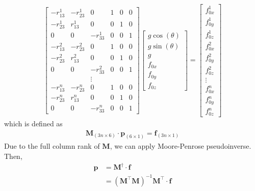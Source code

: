 \begin{equation}
\begin{split}
\begin{bmatrix}
-r_{13}^1		&-r_{23} ^1		&0			&1		&0		&0\\
-r_{23}^1		&r_{13}^1		&0			&0		&1		&0\\
0				&0				&-r_{33}^1	&0		&0		&1\\
-r_{13}^2		&-r_{23}^2 		&0			&1		&0		&0\\
-r_{23}^2		&r_{13}^2		&0			&0		&1		&0\\
0				&0				&-r_{33}^2	&0		&0		&1\\
&&\vdots\\
-r_{13}^n		&-r_{23}^n 		&0			&1		&0		&0\\
-r_{23}^n		&r_{13}^n		&0			&0		&1		&0\\
0				&0				&-r_{33}^n	&0		&0		&1
\end{bmatrix}
\begin{bmatrix}
g\cos(\theta)\\
g\sin(\theta)\\
g\\
f_{0x}\\
f_{0y}\\
f_{0z}
\end{bmatrix}
=
\begin{bmatrix}
f^1_{0x}\\
f^1_{0y}\\
f^1_{0z}\\
f^2_{0x}\\
f^2_{0y}\\
f^2_{0z}\\
\vdots\\
f^n_{0x}\\
f^n_{0y}\\
f^n_{0z}
\end{bmatrix}
\end{split}
\end{equation}
which is defined as 
\begin{equation*}
\begin{split}
\mathbf{M}_{\left(3n \times 6\right)} \cdot \boldsymbol{p}_{\left(6 \times 1\right)} = \boldsymbol{f}_{\left(3n \times 1\right)}
\end{split}
\end{equation*}
Due to the full column rank of $\mathbf{M}$, we can apply Moore-Penrose pseudoinverse. Then, 
\begin{equation*}
\begin{split}
\boldsymbol{p} 	&= \mathbf{M}^{\dagger} \cdot \boldsymbol{f}\\
				&= \left( \mathbf{M}^\top\mathbf{M}\right) ^{-1}\mathbf{M}^\top \cdot \boldsymbol{f}
\end{split}
\end{equation*}
